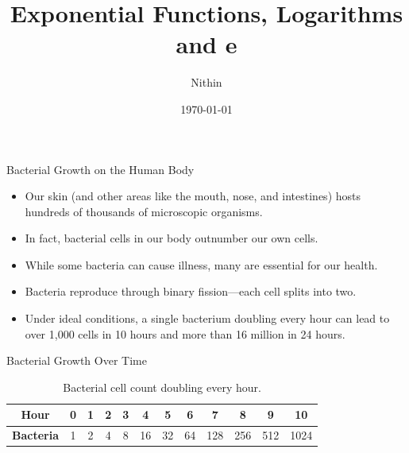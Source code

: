\documentclass{beamer}
\title{Exponential Functions, Logarithms and e}
\author{Nithin}
\institute{}
\date{\today}
\begin{document}
\begin{frame}
  \titlepage
\end{frame}
\begin{frame}
  \tableofcontents
\end{frame}


\begin{frame}{Bacterial Growth on the Human Body}
  \begin{itemize}
    \item Our skin (and other areas like the mouth, nose, and intestines) hosts hundreds of thousands of microscopic organisms.
    \item In fact, bacterial cells in our body outnumber our own cells.
    \item While some bacteria can cause illness, many are essential for our health.
    \item Bacteria reproduce through binary fission—each cell splits into two.
    \item Under ideal conditions, a single bacterium doubling every hour can lead to over 1,000 cells in 10 hours and more than 16 million in 24 hours.
  \end{itemize}
\end{frame}

\begin{frame}{Bacterial Growth Over Time}
  \begin{table}[ht]
    \centering
    \begin{tabular}{c|ccccccccccc}
      \textbf{Hour} & 0 & 1 & 2 & 3 & 4 & 5 & 6 & 7 & 8 & 9 & 10 \\ \hline
      \textbf{Bacteria} & 1 & 2 & 4 & 8 & 16 & 32 & 64 & 128 & 256 & 512 & 1024 \\
    \end{tabular}
    \caption{Bacterial cell count doubling every hour.}
  \end{table}
\end{frame}

\end{document}
